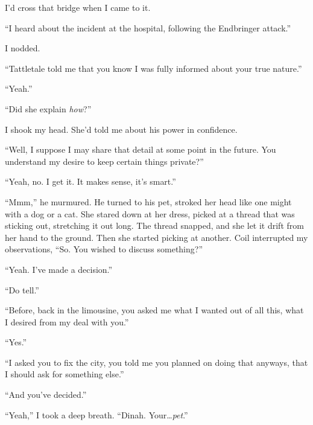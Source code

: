 I'd cross that bridge when I came to it.



``I heard about the incident at the hospital, following the Endbringer attack.''



I nodded.



``Tattletale told me that you know I was fully informed about your true nature.''



``Yeah.''



``Did she explain \emph{how}?''



I shook my head.  She'd told me about his power in confidence.



``Well, I suppose I may share that detail at some point in the future.  You understand my desire to keep certain things private?''



``Yeah, no.  I get it.  It makes sense, it's smart.''



``Mmm,'' he murmured.  He turned to his pet, stroked her head like one might with a dog or a cat.  She stared down at her dress, picked at a thread that was sticking out, stretching it out long.  The thread snapped, and she let it drift from her hand to the ground.  Then she started picking at another.  Coil interrupted my observations, ``So.  You wished to discuss something?''



``Yeah.  I've made a decision.''



``Do tell.''



``Before, back in the limousine, you asked me what I wanted out of all this, what I desired from my deal with you.''



``Yes.''



``I asked you to fix the city, you told me you planned on doing that anyways, that I should ask for something else.''



``And you've decided.''



``Yeah,'' I took a deep breath.  ``Dinah.  Your\ldots \emph{pet}.''



